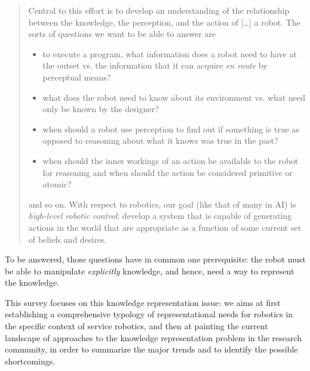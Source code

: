 \documentclass[a4paper, twocolumn]{article}
\begin{document}
\begin{quotation}

    Central to this effort is to develop an understanding of the relationship
    between the knowledge, the perception, and the action of [\ldots] a robot. The
    sorts of questions we want to be able to answer are

    \begin{itemize} 

        \item to execute a program, what information does a robot need to have
        at the outset vs. the information that it can acquire \emph{en route}
        by perceptual means?

        \item what does the robot need to know about its environment vs. what
        need only be known by the designer?

        \item when should a robot use perception to find out if something is
        true as opposed to reasoning about what it knows was true in the past?

        \item when should the inner workings of an action be available to the
        robot for reasoning and when should the action be considered primitive
        or atomic?

    \end{itemize}

    and so on. With respect to robotics, our goal (like that of many in AI) is
    \emph{high-level robotic control}: develop a system that is capable of
    generating actions in the world that are appropriate as a function of some
    current set of beliefs and desires.

\end{quotation}

To be answered, those questions have in common one prerequisite: the robot must
be able to manipulate \emph{explicitly} knowledge, and hence, need a way to
represent the knowledge.

This survey focuses on this knowledge representation issue: we aims at first
establishing a comprehensive typology of representational needs for
robotics in the specific context of service robotics, and then at painting the
current landscape of approaches to the knowledge representation problem in the
research community, in order to summarize the major trends and to identify the
possible shortcomings.
\end{document}
